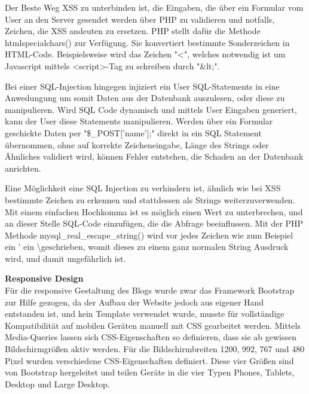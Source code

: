 {    Der Beste Weg XSS zu unterbinden ist, die Eingaben, die über ein Formular vom User an den Server gesendet werden über PHP zu validieren und notfalls, Zeichen, die
    XSS andeuten zu ersetzen. PHP stellt dafür die Methode htmlspecialchars() zur Verfügung. Sie konvertiert bestimmte Sonderzeichen in HTML-Code. Beispielsweise wird
    das Zeichen "<", welches notwendig ist um Javascript mittels <script>-Tag zu schreiben durch "\&lt;".

    Bei einer SQL-Injection hingegen injiziert ein User SQL-Statements in eine Anwedungung um somit Daten aus der Datenbank auszulesen, oder diese zu manipulieren.
    Wird SQL Code dynamisch und mittels User Eingaben generiert, kann der User diese Statements manipulieren. Werden über ein Formular
    geschickte Daten per "\$\_POST['name'];" direkt in ein SQL Statement übernommen, ohne auf korrekte Zeicheneingabe, Länge des Strings oder Ähnliches validiert wird,
    können Fehler entstehen, die Schaden an der Datenbank anrichten.

    Eine Möglichkeit eine SQL Injection zu verhindern ist, ähnlich wie bei XSS bestimmte Zeichen zu erkennen und stattdessen als Strings weiterzuverwenden.
    Mit einem einfachen Hochkomma ist es möglich einen Wert zu unterbrechen, und an dieser Stelle SQL-Code einzufügen, die die Abfrage beeinflussen.
    Mit der PHP Methode mysql\_real\_escape\_string() wird vor jedes Zeichen wie zum Beispiel ein ' ein \textbackslash geschrieben, womit dieses zu einem ganz normalen
    String Ausdruck wird, und damit ungefährlich ist.

    \textbf{Responsive Design}\\
    Für die responsive Gestaltung des Blogs wurde zwar das Framework Bootstrap zur Hilfe gezogen, da der Aufbau der Website jedoch aus eigener Hand
    entstanden ist, und kein Template verwendet wurde, musste für vollständige Kompatibilität auf mobilen Geräten manuell mit CSS gearbeitet werden.
    Mittels Media-Queries lassen sich CSS-Eigenschaften so definieren, dass sie ab gewissen Bildschirmgrößen aktiv werden. Für die Bildschirmbreiten 1200, 992, 767 und 480
    Pixel wurden verschiedene CSS-Eigenschaften definiert. Diese vier Größen sind von Bootstrap hergeleitet und teilen Geräte in die vier Typen Phones, Tablets,
    Desktop und Large Desktop.

}
